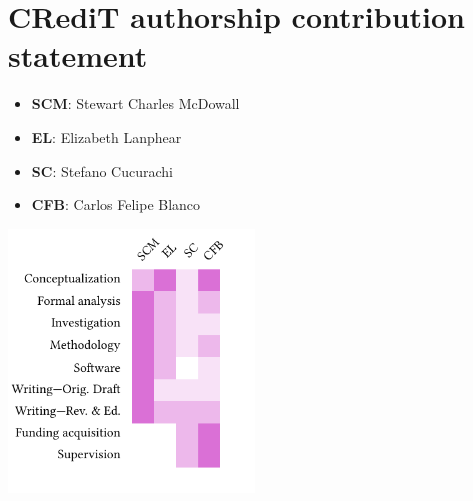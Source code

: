 \documentclass[review,3p,authoryear]{elsarticle}
\newcommand{\cbox}[1]{
    \begin{tcolorbox}[hbox, colback=red!5!white, colframe=red!65!black, boxrule=0.25pt, boxsep=2pt, left=2pt, right=2pt, top=1pt, bottom=1pt]
        \small\sffamily #1
    \end{tcolorbox}
    }
\begin{document}

\section*{CRediT authorship contribution statement}

\begin{itemize}[noitemsep]
    \item \textbf{SCM}: Stewart Charles McDowall
    \item \textbf{EL}: Elizabeth Lanphear
    \item \textbf{SC}: Stefano Cucurachi
    \item \textbf{CFB}: Carlos Felipe Blanco
\end{itemize}

\includegraphics[width=\columnwidth, height=7cm, keepaspectratio]{credit.pdf}
\end{document}
